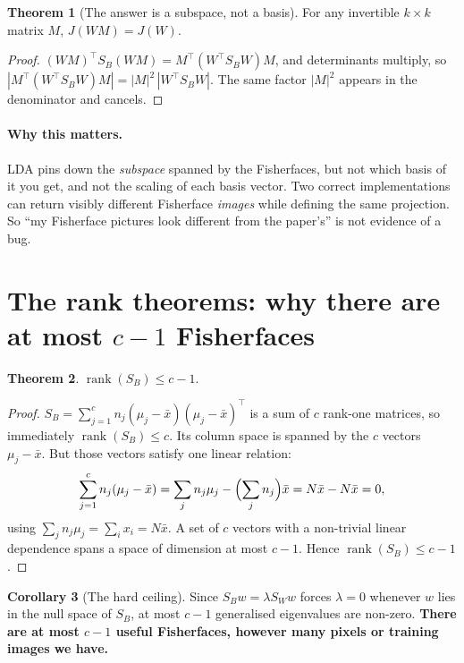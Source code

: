 \documentclass[11pt]{article}
\theoremstyle{definition}
\newtheorem{theorem}{Theorem}[section]
\newtheorem{corollary}[theorem]{Corollary}
\theoremstyle{remark}
\newcommand{\Sw}{S_W}
\newcommand{\Sb}{S_B}
\newcommand{\rank}{\operatorname{rank}}
\begin{document}
\begin{theorem}[The answer is a subspace, not a basis]\label{thm:invariance}
For any invertible $k\times k$ matrix $M$, $J(WM) = J(W)$.
\end{theorem}
\begin{proof}
$(WM)^{\!\top}\Sb(WM) = M^{\!\top}(W^{\!\top}\Sb W)M$, and determinants multiply, so
$|M^{\!\top}(W^{\!\top}\Sb W)M| = |M|^2\,|W^{\!\top}\Sb W|$. The same factor $|M|^2$ appears in
the denominator and cancels.
\end{proof}

\paragraph{Why this matters.} LDA pins down the \emph{subspace} spanned by the
Fisherfaces, but not which basis of it you get, and not the scaling of each basis
vector. Two correct implementations can return visibly different Fisherface
\emph{images} while defining the same projection. So ``my Fisherface pictures look
different from the paper's'' is not evidence of a bug.

\section{The rank theorems: why there are at most \texorpdfstring{$c-1$}{c-1} Fisherfaces}
\label{sec:rankthms}

\begin{theorem}\label{thm:rankSb}
$\rank(\Sb)\le c-1$.
\end{theorem}
\begin{proof}
$\Sb=\sum_{j=1}^c n_j(\mu_j-\bar{x})(\mu_j-\bar{x})^{\!\top}$ is a sum of $c$ rank-one matrices,
so immediately $\rank(\Sb)\le c$. Its column space is spanned by the $c$ vectors
$\mu_j-\bar{x}$. But those vectors satisfy one linear relation:
\[
  \sum_{j=1}^{c} n_j(\mu_j-\bar{x}) = \sum_j n_j\mu_j - \Bigl(\sum_j n_j\Bigr)\bar{x} = N\bar{x} - N\bar{x} = 0,
\]
using $\sum_j n_j\mu_j = \sum_i x_i = N\bar{x}$. A set of $c$ vectors with a non-trivial
linear dependence spans a space of dimension at most $c-1$. Hence
$\rank(\Sb)\le c-1$.
\end{proof}

\begin{corollary}[The hard ceiling]\label{cor:ceiling}
Since $\Sb w=\lambda\Sw w$ forces $\lambda=0$ whenever $w$ lies in the null space of
$\Sb$, at most $c-1$ generalised eigenvalues are non-zero. \textbf{There are at
most $c-1$ useful Fisherfaces, however many pixels or training images we have.}
\end{corollary}
\end{document}
